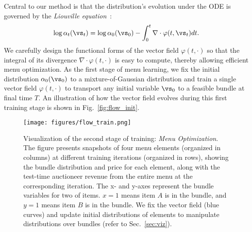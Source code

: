Central to our method is that the distribution's evolution under the ODE
is governed by the {\em Liouville equation}~\cite{liouville1838note}:
%
\begin{align}
    \log \alpha_t(\vs_t) = \log \alpha_0(\vs_0) -\int_0^t \nabla\cdot\varphi(t, \vs_t) dt.\label{equ:demo_liouville}
\end{align}
We carefully design the functional forms of the vector field $\varphi(t, \cdot)$ so that the integral of its divergence $\nabla\cdot\varphi(t, \cdot)$ is easy to compute, thereby allowing efficient menu optimization. As the first stage of menu learning, we fix the initial distribution $\alpha_0(\vs_0)$ to a mixture-of-Gaussian distribution 
and train a single vector field $\varphi(t, \cdot)$ to transport any initial variable $\vs_0$ to a feasible bundle at final time $T$. An illustration of how the vector field evolves during this first training stage is shown in Fig.~\ref{fig:flow_init}.

\begin{figure}
    \centering
    \texttt{[image: figures/flow\_train.png]}
    \caption{Visualization of the second stage of training: \emph{Menu Optimization}. The figure presents snapshots of four menu elements (organized in columns) at different training iterations (organized in rows), showing the bundle distribution and price for each element, along with the test-time auctioneer revenue from the entire menu at the corresponding iteration. The x- and y-axes represent the bundle variables for two of items. $x=1$ means item $A$ is in the bundle, and $y=1$ means item $B$ is in the bundle. We fix the vector field (blue curves) and update initial distributions of elements to manipulate distributions over bundles (refer to Sec.~\ref{sec:viz}).%
    \label{fig:flow_train}}
\end{figure}

